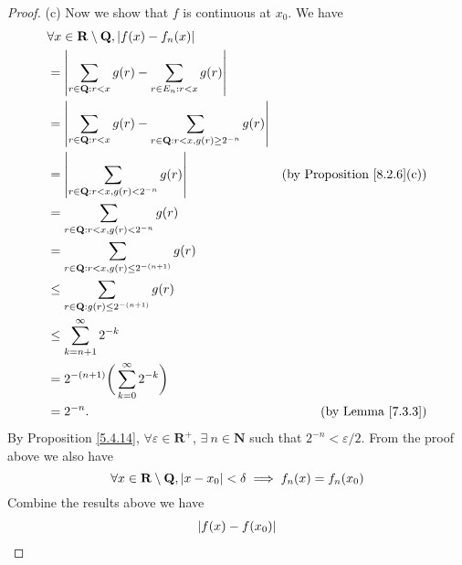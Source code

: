 \begin{proof}{(c)}
    Now we show that \(f\) is continuous at \(x_0\).
    We have
    \begin{align*}
         & \forall x \in \mathbf{R} \setminus \mathbf{Q}, \abs*{f(x) - f_n(x)}                                                                             \\
         & = \abs*{\sum_{r \in \mathbf{Q} : r < x} g(r) - \sum_{r \in E_n : r < x} g(r)}                                                                   \\
         & = \abs*{\sum_{r \in \mathbf{Q} : r < x} g(r) - \sum_{r \in \mathbf{Q} : r < x, g(r) \geq 2^{-n}} g(r)}                                          \\
         & = \abs*{\sum_{r \in \mathbf{Q} : r < x, g(r) < 2^{-n}} g(r)}                                           & \text{(by Proposition \ref{8.2.6}(c))} \\
         & = \sum_{r \in \mathbf{Q} : r < x, g(r) < 2^{-n}} g(r)                                                                                           \\
         & = \sum_{r \in \mathbf{Q} : r < x, g(r) \leq 2^{-(n + 1)}} g(r)                                                                                  \\
         & \leq \sum_{r \in \mathbf{Q} : g(r) \leq 2^{-(n + 1)}} g(r)                                                                                      \\
         & \leq \sum_{k = n + 1}^\infty 2^{-k}                                                                                                             \\
         & = 2^{-(n + 1)} \bigg(\sum_{k = 0}^\infty 2^{-k}\bigg)                                                                                           \\
         & = 2^{-n}.                                                                                              & \text{(by Lemma \ref{7.3.3})}
    \end{align*}
    By Proposition \ref{5.4.14}, \(\forall \varepsilon \in \mathbf{R}^+\), \(\exists\ n \in \mathbf{N}\) such that \(2^{-n} < \varepsilon / 2\).
    From the proof above we also have
    \[
        \forall x \in \mathbf{R} \setminus \mathbf{Q}, \abs*{x - x_0} < \delta \implies f_n(x) = f_n(x_0) \\
    \]
    Combine the results above we have
    \begin{align*}
         & \abs*{f(x) - f(x_0)}                               \\

\end{align*}
\end{proof}
